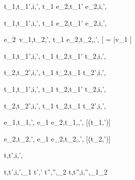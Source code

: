   {t_1,\sigma\symhandle t_1',i,\sigma',\phi}
  {t_1 \Then e_2,\sigma\symhandle t_1' \Then e_2,i,\sigma',\phi}

  {t_1,\sigma\symhandle t_1',i,\sigma',\phi}
  {t_1 \Next e_2,\sigma\symhandle t_1' \Next e_2,i,\sigma',\phi}

  {e_2\ v_1,\sigma \symnormalise t_2,\sigma',\phi}
  {t_1 \Next e_2,\sigma \symhandle t_2,\Continue,\sigma',\phi}
  [ = \bar{v}_1 \wedge \neg{}]


  {t_1,\sigma\symhandle t_1',i,\sigma',\phi}
  {t_1 \And t_2,\sigma\symhandle t_1' \And t_2,\First i,\sigma',\phi}

  {t_2,\sigma\symhandle t_2',i,\sigma',\phi}
  {t_1 \And t_2,\sigma\symhandle t_1 \And t_2',\Second i,\sigma',\phi}


  {t_1,\sigma \symhandle t_1',i,\sigma',\phi}
  {t_1 \Or t_2,\sigma \symhandle t_1' \Or t_2,\First i,\sigma',\phi}

  {t_2,\sigma\symhandle t_2',i,\sigma',\phi }
  {t_1 \Or t_2,\sigma \symhandle t_1 \Or t_2',\Second i,\sigma',\phi}


  {e_1,\sigma\symnormalise t_1,\sigma',\phi}
  {e_1 \Xor e_2,\sigma\symhandle t_1,\Left,\sigma',\phi}
  [\neg\Failing(t_1,\sigma')]

  {e_2,\sigma \symnormalise t_2,\sigma',\phi}
  {e_1 \Xor e_2,\sigma \symhandle t_2,\Right,\sigma',\phi}
  [\neg\Failing(t_2,\sigma')]



  {t,\sigma\symdrive  t',i,\sigma',\phi}


  {t,\sigma \symhandle t',i,\sigma',\phi_1 \Quad
   t',\sigma' \symnormalise t'',\sigma'',\phi_2}
  {t,\sigma \symdrive t'',i,\sigma'',\phi_1\wedge\phi_2}
